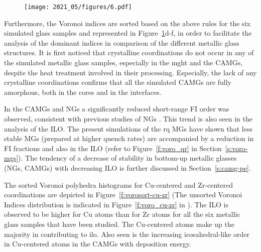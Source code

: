 \begin{changebar}
\begin{figure}[!ht]
	\centering
	\texttt{[image: 2021\_05/figures/6.pdf]}
	\label{f:voro_camg}
\end{figure}

Furthermore, the Voronoi indices are sorted based on the above rules for the six simulated glass samples and represented in Figure~\ref{f:voro_camg}d-f, in order to facilitate the analysis of the dominant indices in comparison of the different metallic glass structures. It is first noticed that crystalline coordinations do not occur in any of the simulated metallic glass samples, especially in the \gls{mght} and the CAMGs, despite the heat treatment involved in their processing. Especially, the lack of any crystalline coordinations confirms that all the simulated CAMGs are fully amorphous, both in the cores and in the interfaces. \par

In the CAMGs and NGs a significantly reduced short-range FI order was observed, consistent with previous studies of NGs \cite{Adjaoud2019}. This trend is also seen in the analysis of the ILO. The present simulations of the \gls{rq} \cz MGs have shown that less stable MGs (prepared at higher quench rates) are accompanied by a reduction in FI fractions and also in the ILO (refer to Figure~\ref{f:voro_qr} in Section~\ref{s:voro-mgs}). The tendency of a decrease of stability in bottom-up metallic glasses (NGs, CAMGs) with decreasing ILO is further discussed in Section~\ref{s:camg-pe}. \par
\end{changebar}

The sorted Voronoi polyhedra histograms for Cu-centered and Zr-centered coordinations are depicted in Figure~\ref{f:vorosort-cu-zr} (The unsorted Voronoi Indices distribution is indicated in Figure~\ref{f:voro_cu-zr} in ). The ILO is observed to be higher for Cu atoms than for Zr atoms for all the six metallic glass samples that have been studied. The Cu-centered atoms make up the majority in contributing to \gls{ilo}. Also seen is the increasing icosahedral-like order in Cu-centered atoms in the CAMGs with deposition energy. \par

